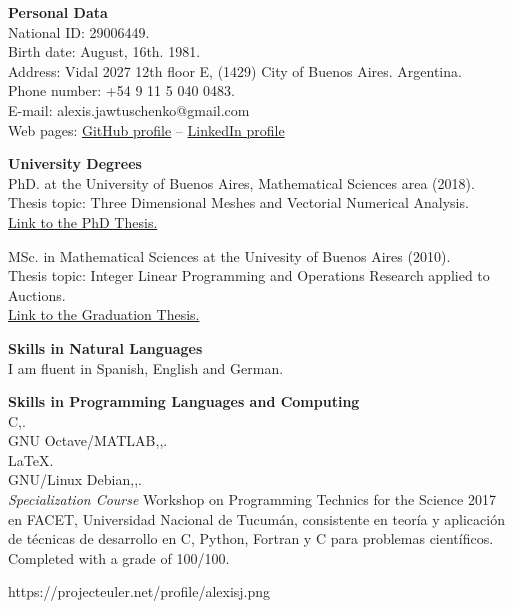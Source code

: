 \textbf{Personal Data}\\[6pt]
National ID: 29006449.\\
Birth date: August, 16th. 1981.\\
Address: Vidal 2027 12th floor E, (1429) City of Buenos Aires. Argentina.\\
Phone number: +54 9 11 5 040 0483.\\
E-mail: alexis.jawtuschenko@gmail.com\\
Web pages: \href{https://github.com/alexisjawtu}{{\color{blue}GitHub profile}}
-- \href{https://www.linkedin.com/in/alexis-jawtuschenko/}{{\color{blue}LinkedIn profile}}

\textbf{University Degrees}\\[6pt]
PhD. at the University of Buenos Aires, Mathematical Sciences area (2018).\\
Thesis topic: Three Dimensional Meshes and Vectorial Numerical Analysis.\\
\href{https://cms.dm.uba.ar/academico/carreras/doctorado/thesisJawtuschenko.pdf}
{{\color{blue}Link to the PhD Thesis.}}

MSc. in Mathematical Sciences at the Univesity of Buenos Aires (2010).\\
Thesis topic: Integer Linear Programming and Operations Research applied to Auctions.\\
\href{https://cms.dm.uba.ar/academico/carreras/licenciatura/tesis/2010/Jawtuschenko_Alexis.pdf}
{{\color{blue}Link to the Graduation Thesis.}}

\textbf{Skills in Natural Languages}\\[6pt]
I am fluent in Spanish, English and German.

\textbf{Skills in Programming Languages and Computing}\\[6pt]
C\masmas,\;.\\[4pt]
{GNU Octave/MATLAB},\;,\;.\\[4pt]
{LaTeX}.\\[4pt] 
{GNU/Linux Debian},\;,\;.\\[4pt]
\emph{Specialization Course}
Workshop on Programming Technics for the Science 2017 en FACET, 
Universidad Nacional de Tucum\'an, consistente en teor\'ia y aplicaci\'on de t\'ecnicas 
de desarrollo en C, Python, Fortran y C\masmas\,\,para problemas cient\'ificos.
Completed with a grade of 100/100.

https://projecteuler.net/profile/alexisj.png


